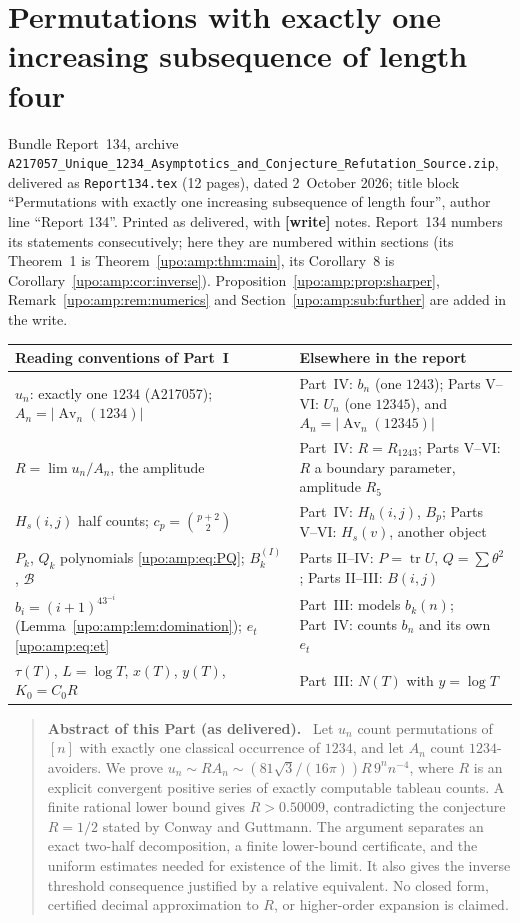 \documentclass[11pt,letterpaper]{article}
\theoremstyle{remark}\newtheorem{remark}[theorem]{Remark}
\numberwithin{equation}{section}
\newcommand{\Av}{\operatorname{Av}}
\newcommand{\tr}{\operatorname{tr}}
\newcommand{\file}[1]{\nolinkurl{#1}}
\newenvironment{partabstract}{\begin{quote}\small\noindent\textbf{Abstract of this Part (as delivered).}\ }{\end{quote}}
\newcommand{\partsource}[1]{\par\noindent\begin{minipage}{\textwidth}\small #1\end{minipage}\par\medskip}
\begin{document}
\part{Permutations with exactly one increasing subsequence of length four}\label{upo:amp:part}
\partsource{Bundle Report~134, archive \file{A217057_Unique_1234_Asymptotics_and_Conjecture_Refutation_Source.zip}, delivered as \file{Report134.tex} (12 pages), dated 2~October 2026; title block ``Permutations with exactly one increasing subsequence of length four'', author line ``Report 134''. Printed as delivered, with \textbf{[write]} notes. Report~134 numbers its statements consecutively; here they are numbered within sections (its Theorem~1 is Theorem~\ref{upo:amp:thm:main}, its Corollary~8 is Corollary~\ref{upo:amp:cor:inverse}). Proposition~\ref{upo:amp:prop:sharper}, Remark~\ref{upo:amp:rem:numerics} and Section~\ref{upo:amp:sub:further} are added in the write.}
\begin{center}
\small
\begin{tabular}{@{}>{\raggedright\arraybackslash}p{} >{\raggedright\arraybackslash}p{}@{}}
\toprule
Reading conventions of Part~I & Elsewhere in the report\\
\midrule
$u_n$: exactly one $1234$ (A217057); $A_n=|\Av_n(1234)|$ & Part~IV: $b_n$ (one $1243$); Parts V--VI: $U_n$ (one $12345$), and $A_n=|\Av_n(12345)|$\\
$R=\lim u_n/A_n$, the amplitude & Part~IV: $R=R_{1243}$; Parts V--VI: $R$ a boundary parameter, amplitude $R_5$\\
$H_s(i,j)$ half counts; $c_p=\binom{p+2}2$ & Part~IV: $H_h(i,j)$, $B_p$; Parts V--VI: $H_s(v)$, another object\\
$P_k$, $Q_k$ polynomials \eqref{upo:amp:eq:PQ}; $B_k^{(I)}$, $\mathcal B$ & Parts II--IV: $P=\tr U$, $Q=\sum\theta^2$; Parts II--III: $B(i,j)$\\
$b_i=(i+1)^43^{-i}$ (Lemma~\ref{upo:amp:lem:domination}); $e_t$ \eqref{upo:amp:eq:et} & Part~III: models $b_k(n)$; Part~IV: counts $b_n$ and its own $e_t$\\
$\tau(T)$, $L=\log T$, $x(T)$, $y(T)$, $K_0=C_0R$ & Part~III: $N(T)$ with $y=\log T$\\
\bottomrule
\end{tabular}
\end{center}
\begin{partabstract}
Let $u_n$ count permutations of $[n]$ with exactly one classical occurrence of
$1234$, and let $A_n$ count $1234$-avoiders. We prove
$u_n\sim R A_n\sim (81\sqrt3/(16\pi))R\,9^n n^{-4}$, where $R$ is an
explicit convergent positive series of exactly computable tableau counts.
A finite rational lower bound gives $R>0.50009$, contradicting the conjecture
$R=1/2$ stated by Conway and Guttmann. The argument separates an exact
two-half decomposition, a finite lower-bound certificate, and the uniform
estimates needed for existence of the limit. It also gives the inverse
threshold consequence justified by a relative equivalent. No closed form,
certified decimal approximation to $R$, or higher-order expansion is claimed.
\end{partabstract}
\end{document}
